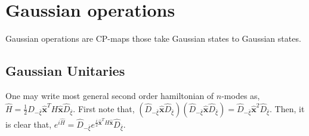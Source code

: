 \documentclass[english,10pt,a4paper]{article}
\newcommand{\xx}{\hat{\textbf{x}}}
\newcommand{\dd}[1]{\hat{D}_{#1}}
\newcommand{\half}{\frac{1}{2}}
\begin{document}
	\section{Gaussian operations}
	Gaussian operations are CP-maps those take Gaussian states to Gaussian states.
	\subsection{Gaussian Unitaries}
	One may write most general second order hamiltonian of $n$-modes as, $\hat{H}=\half \dd{-\bar{\xi}} \xx^T H \xx \dd{\bar{\xi}} $.
	First note that, $(\dd{-\bar{\xi}} \xx \dd{\bar{\xi}}) (\dd{-\bar{\xi}} \xx \dd{\bar{\xi}}) = \dd{-\bar{\xi}} \xx^2 \dd{\bar{\xi}}$. Then, 
	it is clear that, $ e^{i\hat{H}} =  \dd{-\bar{\xi}} e^{\frac{i}{2}\xx^T H \xx } \dd{\bar{\xi}}$.
\end{document}
